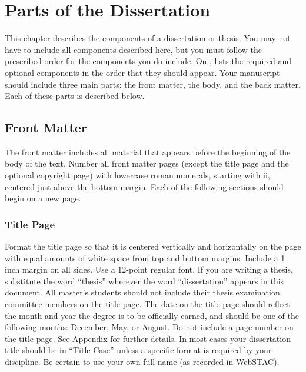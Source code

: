 \chapter{Parts of the Dissertation}
\label{chap:dissertation-parts}

This chapter describes the components of a dissertation or thesis.
You may not have to include all components described here, but you must follow the prescribed order for the components you do include.
On ,  lists the required and optional components in the order that they should appear.
Your manuscript should include three main parts: the front matter, the body, and the back matter.
Each of these parts is described below.

\section{Front Matter}

The front matter includes all material that appears before the beginning of the body of the text.
Number all front matter pages (except the title page and the optional copyright page) with lowercase roman numerals, starting with ii, centered just above the bottom margin.
Each of the following sections should begin on a new page.

\subsection{Title Page}

Format the title page so that it is centered vertically and horizontally on the page with equal amounts of white space from top and bottom margins.
Include a 1 inch margin on all sides.
Use a 12-point regular font.
If you are writing a thesis, substitute the word ``thesis'' wherever the word ``dissertation'' appears in this document.
All master's students should not include their thesis examination committee members on the title page.
The date on the title page should reflect the month and year the degree is to be officially earned, and should be one of the following months: December, May, or August.
Do not include a page number on the title page.
See Appendix for further details.
In most cases your dissertation title should be in ``Title Case'' unless a specific format is required by your discipline.
Be certain to use your own full name (as recorded in \href{https://acadinfo.wustl.edu/}{WebSTAC}).

